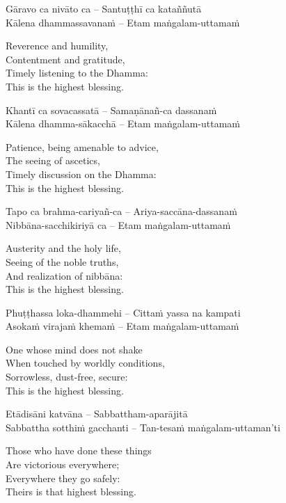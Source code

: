 Gāravo ca nivāto ca – Santuṭṭhī ca kataññutā\\
Kālena dhammassavanaṁ – Etam maṅgalam-uttamaṁ

\begin{english-verses}
  Reverence and humility,\\
  Contentment and gratitude,\\
  Timely listening to the Dhamma:\\
  This is the highest blessing.
\end{english-verses}

Khantī ca sovacassatā – Samaṇānañ-ca dassanaṁ\\
Kālena dhamma-sākacchā – Etam maṅgalam-uttamaṁ

\begin{english-verses}
  Patience, being amenable to advice,\\
  The seeing of ascetics,\\
  Timely discussion on the Dhamma:\\
  This is the highest blessing.
\end{english-verses}

Tapo ca brahma-cariyañ-ca – Ariya-saccāna-dassanaṁ\\
Nibbāna-sacchikiriyā ca – Etam maṅgalam-uttamaṁ

\begin{english-verses}
  Austerity and the holy life,\\
  Seeing of the noble truths,\\
  And realization of nibbāna:\\
  This is the highest blessing.
\end{english-verses}

Phuṭṭhassa loka-dhammehi – Cittaṁ yassa na kampati\\
Asokaṁ virajaṁ khemaṁ – Etam maṅgalam-uttamaṁ

\begin{english-verses}
  One whose mind does not shake\\
  When touched by worldly conditions,\\
  Sorrowless, dust-free, secure:\\
  This is the highest blessing.
\end{english-verses}

Etādisāni katvāna – Sabbattham-aparājitā\\
Sabbattha sotthiṁ gacchanti – Tan-tesaṁ maṅgalam-uttaman'ti

\begin{english-verses}
  Those who have done these things\\
  Are victorious everywhere;\\
  Everywhere they go safely:\\
  Theirs is that highest blessing.
\end{english-verses}

